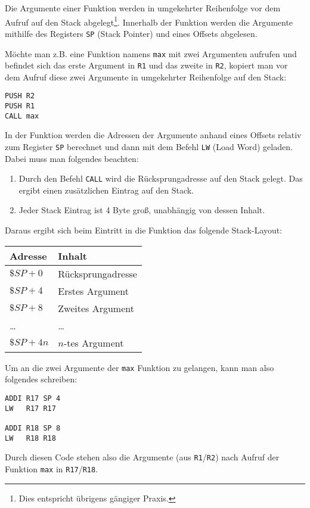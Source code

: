 Die Argumente einer Funktion werden in umgekehrter Reihenfolge vor dem Aufruf
auf den Stack abgelegt\footnote{Dies entspricht übrigens gängiger Praxis.}.
Innerhalb der Funktion werden die Argumente mithilfe des Registers \texttt{SP}
(Stack Pointer) und eines Offsets abgelesen.

Möchte man z.B. eine Funktion namens \texttt{max} mit zwei Argumenten aufrufen
und befindet sich das erste Argument in \texttt{R1} und das zweite in \texttt{R2},
kopiert man vor dem Aufruf diese zwei Argumente in umgekehrter Reihenfolge auf
den Stack:
\begin{lstlisting}
PUSH R2
PUSH R1
CALL max
\end{lstlisting}
In der Funktion werden die Adressen der Argumente anhand eines Offsets relativ
zum Register \texttt{SP} berechnet und dann mit dem Befehl \texttt{LW} (Load Word)
geladen. Dabei muss man folgendes beachten:
\begin{enumerate}
 \item Durch den Befehl \texttt{CALL} wird die Rücksprungadresse auf den Stack
       gelegt. Das ergibt einen zusätzlichen Eintrag auf den Stack.
 \item Jeder Stack Eintrag ist 4 Byte groß, unabhängig von dessen Inhalt.
\end{enumerate}
Daraus ergibt sich beim Eintritt in die Funktion das folgende Stack-Layout:
\begin{center}
 \begin{tabular}{ll}
  Adresse     & Inhalt \\\hline
  $\$SP + 0$  & Rücksprungadresse \\
  $\$SP + 4$  & Erstes Argument   \\
  $\$SP + 8$  & Zweites Argument  \\
  \ldots      & \ldots            \\
  $\$SP + 4n$ & $n$-tes Argument
 \end{tabular}
\end{center}
Um an die zwei Argumente der \texttt{max} Funktion zu gelangen, kann man also
folgendes schreiben:
\begin{lstlisting}
ADDI R17 SP 4
LW   R17 R17

ADDI R18 SP 8
LW   R18 R18
\end{lstlisting}
Durch diesen Code stehen also die Argumente (aus \texttt{R1}/\texttt{R2}) nach
Aufruf der Funktion \texttt{max} in \texttt{R17}/\texttt{R18}.

